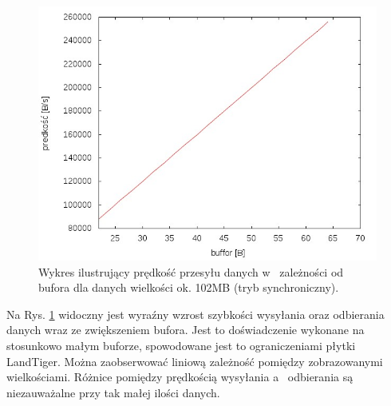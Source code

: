 \documentclass{BscUS}
\begin{document}
\newline
\begin{figure}[H]
{
\centering
\includegraphics[width=1\textwidth]{./img/S_107374200Receive}
\caption{Wykres ilustrujący prędkość przesyłu danych w~ zależności od bufora dla danych wielkości ok. 102MB (tryb synchroniczny).}
\label{fig:S_107374200Receive}
}
\end{figure}
\noindent Na Rys. \ref{fig:S_107374200Receive} widoczny jest wyraźny wzrost szybkości wysyłania oraz odbierania danych wraz ze zwiększeniem bufora. Jest to doświadczenie wykonane na stosunkowo małym buforze, spowodowane jest to ograniczeniami płytki LandTiger. Można zaobserwować liniową zależność pomiędzy zobrazowanymi wielkościami. Różnice pomiędzy prędkością wysyłania a~ odbierania są niezauważalne przy tak małej ilości danych.
\end{document}
